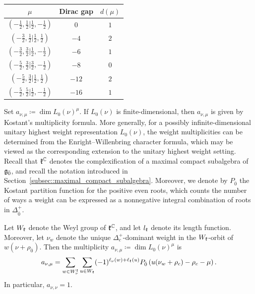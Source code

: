 \begin{example}
\begin{center}
\small
\setlength{\tabcolsep}{6pt}
\renewcommand{\arraystretch}{1.1}
\begin{tabular}{|c|c|c|}
\hline
$\mu$ & Dirac gap & $d(\mu)$ \\
\hline
$(-\tfrac12,\tfrac12\vert\tfrac12,-\tfrac12)$
& $0$ & $1$ \\
\hline
$(-\tfrac32,\tfrac12\vert\tfrac12,\tfrac12)$
& $-4$ & $2$ \\
\hline
$(-\tfrac32,\tfrac32\vert\tfrac12,-\tfrac12)$
& $-6$ & $1$  \\
\hline
$(-\tfrac52,\tfrac32\vert\tfrac32,-\tfrac12)$
& $-8$ & $0$  \\
\hline
$(-\tfrac52,\tfrac32\vert\tfrac12,\tfrac12)$
& $-12$ & $2$  \\
\hline
$(-\tfrac52,\tfrac52\vert\tfrac12,-\tfrac12)$
& $-16$ & $1$ \\
\hline
\end{tabular}
\end{center}
\end{example}

Set $a_{\nu,\mu}\coloneqq\dim L_0(\nu)^\mu$. If $L_0(\nu)$ is finite-dimensional, then $a_{\nu,\mu}$ is given by Kostant's multiplicity formula. More generally, for a possibly infinite-dimensional unitary highest weight representation $L_0(\nu)$, the weight multiplicities can be determined from the Enright--Willenbring character formula, which may be viewed as the corresponding extension to the unitary highest weight setting. Recall that ${\mathfrak k}^{{\mathbb C}}$ denotes the complexification of a maximal compact subalgebra of ${\mathfrak{g}_{\bar{0}}}$, and recall the notation introduced in Section~\ref{subsec::maximal_compact_subalgebra}. Moreover, we denote by $P_{\bar0}$ the Kostant partition function for the positive even roots, which counts the number of ways a weight can be expressed as a nonnegative integral combination of roots in $\Delta_{\bar0}^{+}$.

\begin{lemma} Let $W_{{\mathfrak k}}$ denote the Weyl group of ${\mathfrak k}^{{\mathbb C}}$, and let $l_{{\mathfrak k}}$ denote its length function. Moreover, let $\nu_{w}$ denote the unique
$\Delta_{c}^{+}$-dominant weight in the $W_{{\mathfrak k}}$-orbit of
$w(\nu+\rho_{\bar0})$. Then the multiplicity $a_{\nu,\mu}\coloneqq\dim L_0(\nu)^\mu$ is
\[
 a_{\nu,\mu}
 =
 \sum_{w\in W_\nu^{{\mathfrak k}}}
 \sum_{u\in W_{{\mathfrak k}}}
 (-1)^{\ell_\nu(w)+\ell_{{\mathfrak k}}(u)}
 P_{\bar{0}}
 \left(
 u(\nu_w+\rho_{c})
 -\rho_{c}-\mu
 \right).
\]
In particular, $a_{\nu,\nu}=1$.
\end{lemma}

